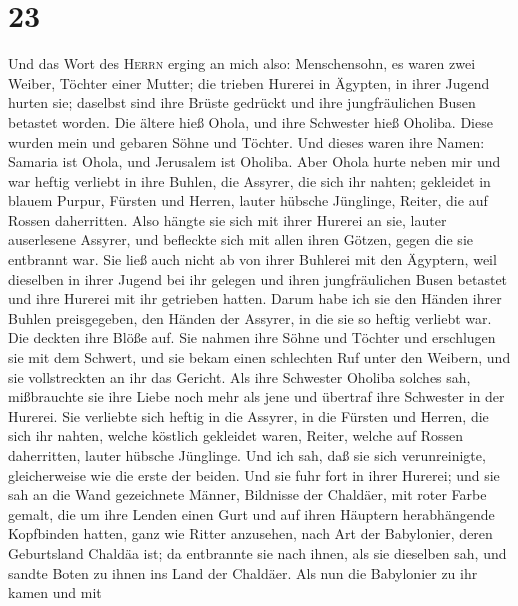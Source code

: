 \hypertarget{section-22}{%
\section{23}\label{section-22}}

 Und das Wort des \textsc{Herrn} erging an mich also:
 Menschensohn, es waren zwei Weiber, Töchter einer Mutter;
 die trieben Hurerei in Ägypten, in ihrer Jugend hurten
sie; daselbst sind ihre Brüste gedrückt und ihre jungfräulichen Busen
betastet worden.  Die ältere hieß Ohola, und ihre
Schwester hieß Oholiba. Diese wurden mein und gebaren Söhne und Töchter.
Und dieses waren ihre Namen: Samaria ist Ohola, und Jerusalem ist
Oholiba.  Aber Ohola hurte neben mir und war heftig
verliebt in ihre Buhlen, die Assyrer, die sich ihr nahten;
 gekleidet in blauem Purpur, Fürsten und Herren, lauter
hübsche Jünglinge, Reiter, die auf Rossen daherritten. 
Also hängte sie sich mit ihrer Hurerei an sie, lauter auserlesene
Assyrer, und befleckte sich mit allen ihren Götzen, gegen die sie
entbrannt war.  Sie ließ auch nicht ab von ihrer Buhlerei
mit den Ägyptern, weil dieselben in ihrer Jugend bei ihr gelegen und
ihren jungfräulichen Busen betastet und ihre Hurerei mit ihr getrieben
hatten.  Darum habe ich sie den Händen ihrer Buhlen
preisgegeben, den Händen der Assyrer, in die sie so heftig verliebt war.
 Die deckten ihre Blöße auf. Sie nahmen ihre Söhne und
Töchter und erschlugen sie mit dem Schwert, und sie bekam einen
schlechten Ruf unter den Weibern, und sie vollstreckten an ihr das
Gericht.  Als ihre Schwester Oholiba solches sah,
mißbrauchte sie ihre Liebe noch mehr als jene und übertraf ihre
Schwester in der Hurerei.  Sie verliebte sich heftig in
die Assyrer, in die Fürsten und Herren, die sich ihr nahten, welche
köstlich gekleidet waren, Reiter, welche auf Rossen daherritten, lauter
hübsche Jünglinge.  Und ich sah, daß sie sich
verunreinigte, gleicherweise wie die erste der beiden. 
Und sie fuhr fort in ihrer Hurerei; und sie sah an die Wand gezeichnete
Männer, Bildnisse der Chaldäer, mit roter Farbe gemalt, 
die um ihre Lenden einen Gurt und auf ihren Häuptern herabhängende
Kopfbinden hatten, ganz wie Ritter anzusehen, nach Art der Babylonier,
deren Geburtsland Chaldäa ist;  da entbrannte sie nach
ihnen, als sie dieselben sah, und sandte Boten zu ihnen ins Land der
Chaldäer.  Als nun die Babylonier zu ihr kamen und mit
